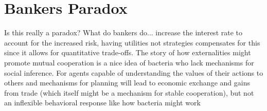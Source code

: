 \documentclass[doc, natbib]{apa6}
\theoremstyle{definition}
\begin{document}







\section{Bankers Paradox}
Is this really a paradox? What do bankers do... increase the interest rate to account for the increased risk, having utilities not strategies compensates for this since it allows for quantitative trade-offs. The story of how externalities might promote mutual cooperation is a nice idea of bacteria who lack mechanisms for social inference. For agents capable of understanding the values of their actions to others and mechanisms for planning will lead to economic exchange and gains from trade (which itself might be a mechanism for stable cooperation), but not an inflexible behavioral response like how bacteria might work 
\end{document}
